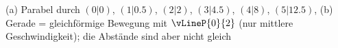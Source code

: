 (a) Parabel durch $(0|0)$, $(1|0.5)$, $(2|2)$, $(3|4.5)$, $(4|8)$, $(5|12.5)$, (b) Gerade = gleichförmige Bewegung mit $\vLineP{0}{2}$ (nur mittlere Geschwindigkeit); die Abstände sind aber nicht gleich
